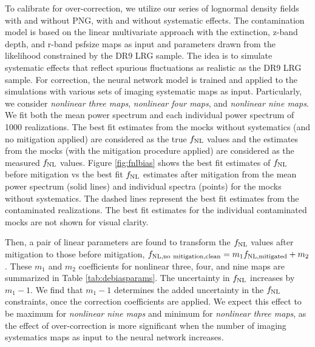 To calibrate for over-correction, we utilize our series of lognormal density fields with and without PNG, with and without systematic effects. The contamination model is based on the linear multivariate approach with the extinction, z-band depth, and r-band psfsize maps as input and parameters drawn from the likelihood constrained by the DR9 LRG sample. The idea is to simulate systematic effects that reflect spurious fluctuations as  realistic as the DR9 LRG sample. For correction, the neural network model is trained and applied to the simulations with various sets of imaging systematic maps as input. Particularly, we consider \textit{nonlinear three maps}, \textit{nonlinear four maps}, and \textit{nonlinear nine maps}. We fit both the mean power spectrum and each individual power spectrum of 1000 realizations. The best fit estimates from the mocks without systematics (and no mitigation applied) are considered as the true $f_{\rm NL}$ values and the estimates from the mocks (with the mitigation procedure applied) are considered as the measured $f_{\rm NL}$ values. Figure \ref{fig:fnlbias} shows the best fit estimates of $f_{\rm NL}$ before mitigation vs the best fit $f_{\rm NL}$ estimates after mitigation from the mean power spectrum (solid lines) and individual spectra (points) for the mocks without systematics. The dashed lines represent the best fit estimates from the contaminated realizations. The best fit estimates for the individual contaminated mocks are not shown for visual clarity. 

Then, a pair of linear parameters are found to transform the $f_{\rm NL}$ values after mitigation to those before mitigation, $f_{\rm NL, no~mitigation, clean} = m_{1} f_{\rm NL, mitigated} + m_{2}$. These $m_{1}$ and $m_{2}$ coefficients for nonlinear three, four, and nine maps are summarized in Table \ref{tab:debiasparams}. The uncertainty in $f_{\rm NL}$ increases by $m_{1}-1$. We find that $m_{1}-1$ determines the added uncertainty in the $f_{\rm NL}$ constraints, once the correction coefficients are applied. We expect this effect to be maximum for \textit{nonlinear nine maps} and minimum for \textit{nonlinear three maps}, as the effect of over-correction is more significant when the number of imaging systematics maps as input to the neural network increases. 

